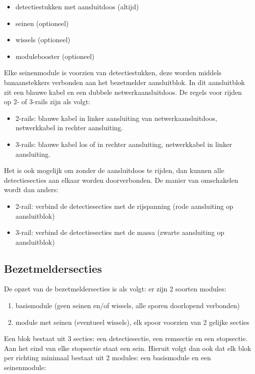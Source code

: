\documentclass[12pt,a4paper]{report}
\begin{document}
\begin{itemize}
\item detectiestukken met aansluitdoos (altijd)
\item seinen (optioneel)
\item wissels (optioneel)
\item modulebooster (optioneel)
\end{itemize}

Elke seinenmodule is voorzien van detectiestukken, deze worden middels banaanstekkers verbonden aan het bezetmelder aansluitblok.  In dit aansluitblok zit een blauwe kabel en een dubbele netwerkaansluitdoos. De regels voor rijden op 2- of 3-rails zijn als volgt:

\begin{itemize}
\item 2-rails: blauwe kabel in linker aansluiting van netwerkaansluitdoos, netwerkkabel in rechter aansluiting.
\item 3-rails: blauwe kabel los of in rechter aansluiting, netwerkkabel in linker aansluiting.
\end{itemize}

Het is ook mogelijk om zonder de aansluitdoos te rijden, dan kunnen alle detectiesecties aan elkaar worden doorverbonden. De manier van omschakelen wordt dan anders:

\begin{itemize}
\item 2-rail: verbind de detectiesecties met de rijspanning (rode aansluiting op aansluitblok)
\item 3-rail: verbind de detectiesecties met de massa (zwarte aansluiting op aansluitblok)
\end{itemize}

\subsection{Bezetmeldersecties}
De opzet van de bezetmeldersecties is als volgt:
er zijn 2 soorten modules:

\begin{enumerate}
\item basismodule (geen seinen en/of wissels, alle sporen doorlopend verbonden)
\item module met seinen (eventueel wissels), elk spoor voorzien van 2 gelijke secties
\end{enumerate}

Een blok bestaat uit 3 secties: een detectiesectie, een remsectie en een stopsectie. Aan het eind van elke stopsectie staat een sein. Hieruit volgt dan ook dat elk blok per richting minimaal bestaat uit 2 modules: een basismodule en een seinenmodule:
\end{document}
